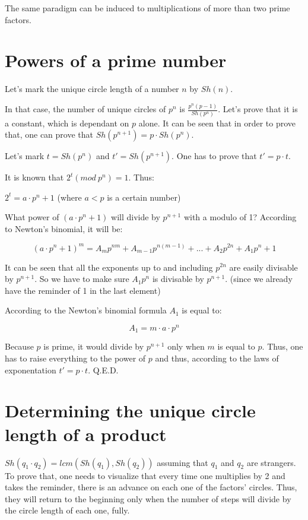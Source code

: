 \documentclass[a4paper]{report}
\begin{document}
The same paradigm can be induced to multiplications of more than two prime
factors.

\section{Powers of a prime number}

Let's mark the unique circle length of a number $ n $ by $ Sh(n) $.

In that case, the number of unique circles of $ p^{n} $ is
$ \frac{p^{n}(p-1)}{Sh(p^{n})} $. Let's prove that it is a constant, which
is dependant on $ p $ alone. It can be seen that in order to prove that,
one can prove that $ Sh(p^{n+1}) = p \cdot Sh(p^{n}) $.

Let's mark $ t = Sh(p^{n}) $ and $ t'=Sh(p^{n+1}) $. One has to prove that
$ t' = p \cdot t $.

It is known that $ 2^{t} (mod ~ p^{n}) = 1 $. Thus:

$ 2^{t} = a \cdot p^{n} + 1 $ (where $ a < p $ is a certain number)

What power of $ (a \cdot p^{n} + 1 ) $ will divide by $ p^{n+1} $ with
a modulo of 1? According to Newton's binomial, it will be:

\[
(a \cdot p^{n} + 1)^{m} = A_{m}p^{nm} + A_{m-1}p^{n(m-1)} + ... + A_{2}p^{2n} + A_{1}p^{n} + 1
\]

It can be seen that all the exponents up to and including $ p^{2n} $ are easily
divisable by $ p^{n+1} $. So we have to make sure $ A_{1}p^{n} $ is divisable
by $ p^{n+1} $. (since we already have the reminder of 1 in the last element)

According to the Newton's binomial formula $ A_{1} $ is equal to:

\[
A_{1} = m \cdot a \cdot p^{n}
\]

Because $ p $ is prime, it would divide by $ p^{n+1} $ only when $ m $ is equal
to $ p $. Thus, one has to raise everything to the power of $ p $ and thus,
according to the laws of exponentation $ t'=p \cdot t $. Q.E.D.

\section{Determining the unique circle length of a product}

$ Sh(q_{1} \cdot q_{2}) = lcm(Sh(q_{1}), Sh(q_{2})) $ assuming
that $ q_{1} $ and $ q_{2} $ are strangers. To prove that, one needs
to visualize that every time one multiplies by 2 and takes the reminder, there
is an advance on each one of the factors' circles. Thus, they will return
to the beginning only when the number of steps will divide by the circle
length of each one, fully.
\end{document}
